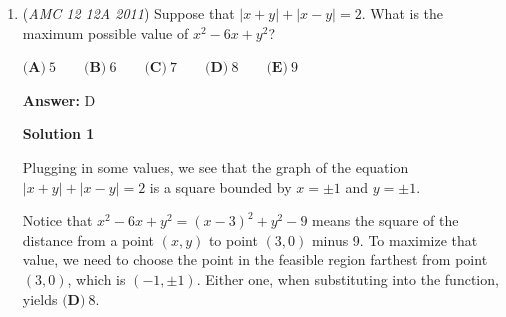 \begin{enumerate}
Let $O_1,O_2,O_3$ be the centers of the circles with radii $1,2,3$. Notice that the points of tangency of the $3$ circles are also the points of tangency of the incircle of $\triangle O_1O_2O_3$. Using the radius of an Incircle formula, $r = \frac{A}{S}$ where $S$ is the semi-perimeter, and noting that $\triangle O_1O_2O_3$ is a 3-4-5 right triangle, we see that, 
 \[r = \frac{3 \cdot 4/2}{\frac{3+4+5}{2}} = 1.\]Now we set $\triangle O_1O_2O_3$ on the coordinate plane with $O_1=(0,0),O_2=(3,0), O_3 = (0,4)$. So the incenter lies on $(1,1)$. Let the points of tangency of $\triangle O_1O_2O_3$ with it's incenter are $A,B,C$ with $A$ on $O_1O_2$, $B$ on $O_1O_3$, and $C$ on $O_2O_3$. We have that $A = (1,0), B=(0,1)$. Since the line defined by $C$ and the incenter is perpendicular to $O_2O_3$ who has equation $y = \frac{-4}{3}x + 4$, we have it's equation as $(y-1) = \frac{3}{4}(x-1) \rightarrow y = \frac{3}{4}x + \frac{1}{4}$. We have the intersection of the $2$ lines at, 
 \begin{align*}\frac{-4}{3}x + 4 &= \frac{3}{4}x + \frac{1}{4} \\ \frac{15}{4} &= \frac{25}{12}x \\ x &= \frac{9}{5} \\ y &= \frac{-4}{3} \frac{9}{5} + 4 = \frac{8}{5}.\end{align*}
Here we can use Shoelace Theorem on the points $(\frac{9}{5}, \frac{8}{5}),(0,1),(1,0)$ we get our areas as $\frac{6}{5} \rightarrow \boxed{(D)}.$



	\item (\textit{AMC 12 12A 2011}) Suppose that $\left|x+y\right|+\left|x-y\right|=2$. What is the maximum possible value of $x^2-6x+y^2$?


 $\textbf{(A)}\ 5 \qquad \textbf{(B)}\ 6 \qquad \textbf{(C)}\ 7 \qquad \textbf{(D)}\ 8 \qquad \textbf{(E)}\ 9$

 \textbf{Answer: }D



\textbf{Solution 1}

Plugging in some values, we see that the  graph of the equation $|x+y|+|x-y| = 2$ is a square bounded by $x= \pm 1$ and $y = \pm 1$.

 Notice that $x^2 - 6x + y^2 = (x-3)^2 + y^2 - 9$ means the square of the distance from a point $(x,y)$ to point $(3,0)$ minus 9. To maximize that value, we need to choose the point in the feasible region farthest from point $(3,0)$, which is $(-1, \pm 1)$. Either one, when substituting into the function, yields $\boxed{\textbf{(D)}\ 8}$.


\end{enumerate}
